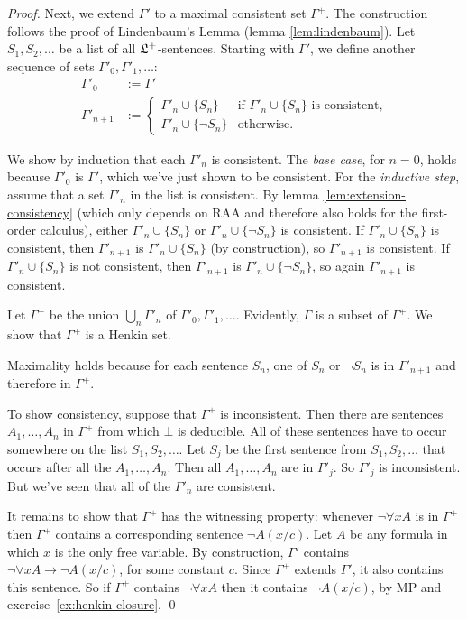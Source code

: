 \begin{proof}
  Next, we extend $\Gamma'$ to a maximal consistent set $\Gamma^{+}$.
  The construction follows the proof of Lindenbaum's Lemma (lemma \ref{lem:lindenbaum}).
  Let $S_{1}, S_{2}, \ldots$ be a list of all $\mathfrak{L}^{+}$-sentences.
  Starting with $\Gamma'$,
  we define another sequence of sets $\Gamma'_{0}, \Gamma'_{1}, \ldots$:
  \begin{align*}
    \Gamma'_{0} & := \Gamma' \\
    \Gamma'_{n+1} & := \begin{cases}
        \Gamma'_{n} \cup \{ S_{n} \} & \text{if } \Gamma'_{n} \cup \{ S_{n} \} \text{ is consistent,} \\
        \Gamma'_{n} \cup \{ \neg S_{n} \} & \text{otherwise.}
        \end{cases}
  \end{align*}

  We show by induction that each $\Gamma'_{n}$ is consistent.
  The \emph{base case}, for $n=0$, holds because $\Gamma'_0$ is $\Gamma'$,
  which we've just shown to be consistent.
  For the \emph{inductive step},
  assume that a set $\Gamma'_n$ in the list is consistent.
  By lemma \ref{lem:extension-consistency}
  (which only depends on RAA and therefore also holds for the first-order calculus),
  either $\Gamma'_n \cup \{ S_n \}$ or $\Gamma'_n \cup \{ \neg S_n \}$ is consistent.
  If $\Gamma'_n \cup \{ S_n \}$ is consistent,
  then $\Gamma'_{n+1}$ is $\Gamma'_n \cup \{ S_n \}$ (by construction),
  so $\Gamma'_{n+1}$ is consistent.
  If $\Gamma'_n \cup \{ S_n \}$ is not consistent,
  then $\Gamma'_{n+1}$ is $\Gamma'_n \cup \{ \neg S_n \}$,
  so again $\Gamma'_{n+1}$ is consistent.

  Let $\Gamma^{+}$ be the union $\bigcup_{n} \Gamma'_{n}$ of $\Gamma'_{0}, \Gamma'_{1}, \ldots$.
  Evidently, $\Gamma$ is a subset of $\Gamma^{+}$.
  We show that $\Gamma^{+}$ is a Henkin set.

  Maximality holds because for each sentence $S_n$,
  one of $S_n$ or $\neg S_n$ is in $\Gamma'_{n+1}$ and therefore in $\Gamma^{+}$.

  To show consistency,
  suppose that $\Gamma^{+}$ is inconsistent.
  Then there are sentences $A_1,\ldots,A_n$ in $\Gamma^+$ from which $\bot$ is deducible.
  All of these sentences have to occur somewhere on the list $S_1,S_2,\ldots$.
  Let $S_j$ be the first sentence from $S_1,S_2,\ldots$ that occurs after
  all the $A_1,\ldots,A_n$.
  Then all $A_1,\ldots,A_n$ are  in $\Gamma'_j$.
  So $\Gamma'_j$ is inconsistent.
  But we've seen that all of the $\Gamma'_n$ are consistent.

  It remains to show that $\Gamma^{+}$ has the witnessing property:
  whenever $\neg \forall x A$ is in $\Gamma^{+}$ then
  $\Gamma^+$ contains a corresponding sentence $\neg A(x/c)$.
  Let $A$ be any formula in which $x$ is the only free variable.
  By construction,
  $\Gamma'$ contains $\neg \forall x A \to \neg A(x/c)$,
  for some constant $c$.
  Since $\Gamma^{+}$ extends $\Gamma'$,
  it also contains this sentence.
  So if $\Gamma^{+}$ contains $\neg \forall x A$
  then it contains $\neg A(x/c)$,
  by MP and exercise~\ref{ex:henkin-closure}.
  \qed
\end{proof}

